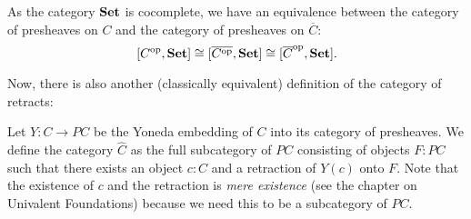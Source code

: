 \begin{corollary}\label{cor:karoubi-presheaf}
  As the category $ \mathbf{Set} $ is cocomplete, we have an equivalence between the category of presheaves on $ C $ and the category of presheaves on $ \overline C $:
  \[ [C^{\text{op}}, \mathbf{Set}] \cong [\overline{C^{\text{op}}}, \mathbf{Set}] \cong [\overline C^{\text{op}}, \mathbf{Set}]. \]
\end{corollary}

Now, there is also another (classically equivalent) definition of the category of retracts:
\begin{definition}\label{def:karoubi'}
  Let $ Y: C \to P C $ be the Yoneda embedding of $ C $ into its category of presheaves. We define the category $ \hat C $ as the full subcategory of $ P C $ consisting of objects $ F : P C $ such that there exists an object $ c: C $ and a retraction of $ Y(c) $ onto $ F $. Note that the existence of $ c $ and the retraction is \textit{mere existence} (see the chapter on Univalent Foundations) because we need this to be a subcategory of $ P C $.
\end{definition}

